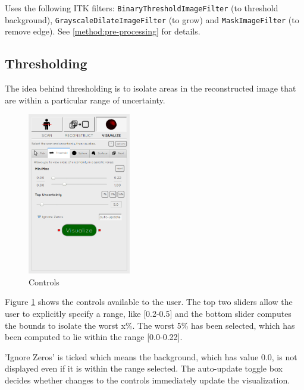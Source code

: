 Uses the following ITK filters: \texttt{BinaryThresholdImageFilter} (to threshold background), \texttt{GrayscaleDilateImageFilter} (to grow) and \texttt{MaskImageFilter} (to remove edge). See \ref{method:pre-processing} for details.


\clearpage
\subsection{Thresholding}\label{implementation:thresholding}
The idea behind thresholding is to isolate areas in the reconstructed image that are within a particular range of uncertainty. 

\begin{figure}
  \vspace{-20pt}
  \includegraphics[width=0.4\textwidth]{images/tool/2_thresholding.png}
  \caption{Controls}\label{fig:threshold_settings}
\end{figure}

Figure \ref{fig:threshold_settings} shows the controls available to the user. The top two sliders allow the user to explicitly specify a range, like [0.2-0.5] and the bottom slider computes the bounds to isolate the worst x$\%$. The worst 5$\%$ has been selected, which has been computed to lie within the range [0.0-0.22].

'Ignore Zeros' is ticked which means the background, which has value 0.0, is not displayed even if it is within the range selected. The auto-update toggle box decides whether changes to the controls immediately update the visualization.

